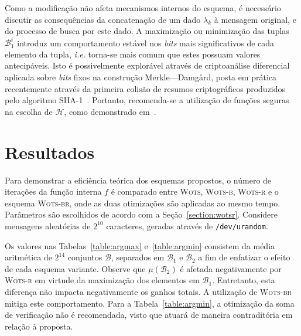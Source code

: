 \documentclass{ufsctex/ufsctex}
\newcommand{\hh}{\mathcal{H}}
\newcommand{\wots}{\textsc{Wots}}
\newcommand{\wotsb}{\textsc{Wots-b}}
\newcommand{\wotsr}{\textsc{Wots-r}}
\newcommand{\wotsbr}{\textsc{Wots-br}}
\begin{document}
Como a modificação não afeta mecanismos internos do esquema, é necessário
discutir as consequências da concatenação de um dado $\lambda_k$ à mensagem
original, e do processo de busca por este dado. A maximização ou minimização
das tuplas $\mathcal{B}_{1}^{i}$ introduz um comportamento estável nos
\emph{bits} mais significativos de cada elemento da tupla, \emph{i.e.} torna-se
mais comum que estes possuam valores antecipáveis. Isto é possivelmente
explorável através de criptoanálise diferencial aplicada sobre \emph{bits}
fixos na construção Merkle---Damgård, posta em prática recentemente através da
primeira colisão de resumos criptográficos produzidos pelo algoritmo
SHA-1~\cite{Stevens:inproc:2017:jul}. Portanto, recomenda-se a utilização de
funções seguras na escolha de $\hh{}$, como demonstrado em~\cite[Seção
3.2]{Huelsing:inproc:2013:jun}.

\section{Resultados}\label{section:results}

Para demonstrar a eficiência teórica dos esquemas propostos, o número de
iterações da função interna $f$ é comparado entre \wots{}, \wotsb{}, \wotsr{} e
o esquema \wotsbr{}, onde as duas otimizações são aplicadas ao mesmo tempo.
Parâmetros são escolhidos de acordo com a Seção~\ref{section:wotsr}. Considere
mensagens aleatórias de $2^{10}$ caracteres, geradas através de
\texttt{/dev/urandom}.

Os valores nas Tabelas~\ref{table:argmax} e~\ref{table:argmin} consistem da
média aritmética de $2^{14}$ conjuntos $\mathcal{B}$, separados em
$\mathcal{B}_1$ e $\mathcal{B}_2$ a fim de enfatizar o efeito de cada esquema
variante. Observe que $\mu(\mathcal{B}_2)$ é afetada negativamente por \wotsr{}
em virtude da maximização dos elementos em $\mathcal{B}_1$. Entretanto, esta
diferença não impacta negativamente os ganhos totais. A utilização de \wotsbr{}
mitiga este comportamento. Para a Tabela~\ref{table:argmin}, a otimização da
soma de verificação não é recomendada, visto que atuará de maneira
contraditória em relação à proposta.
\end{document}
